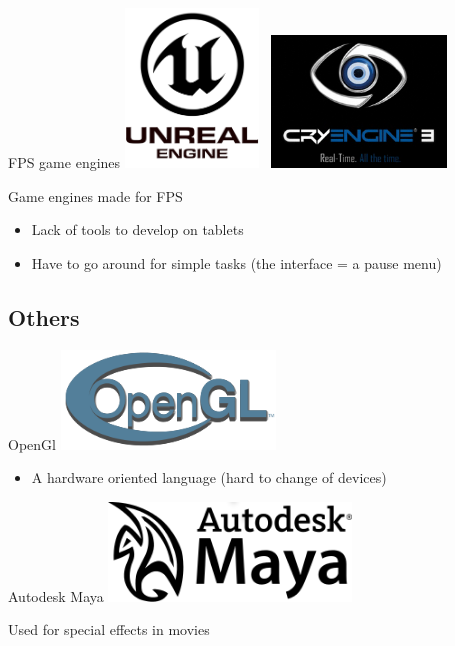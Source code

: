 \documentclass[a4paper,10pt]{beamer}
\begin{document}
			\begin{frame}{FPS game engines}
				\includegraphics[height=120pt]{images/logos/Unreal_Engine.png}  \mbox{     }\includegraphics[height=100pt]{images/logos/Cry_Engine.png}
				
				Game engines made for FPS
				\begin{itemize}
					\item Lack of tools to develop on tablets
					\item Have to go around for simple tasks (the interface = a pause menu)
				\end{itemize}
			\end{frame}
			
			
		\subsection{Others}
		
			\begin{frame}{OpenGl}
				\includegraphics[height=75pt]{images/logos/OpenGL_logo.png}
				\begin{itemize}
					\item A hardware oriented language (hard to change of devices)
				\end{itemize}
			\end{frame}
			
			\begin{frame}{Autodesk Maya}
				\includegraphics[height=75pt]{images/logos/Autodesk_Maya.png}
				
				Used for special effects in movies
			\end{frame}
			
\end{document}
